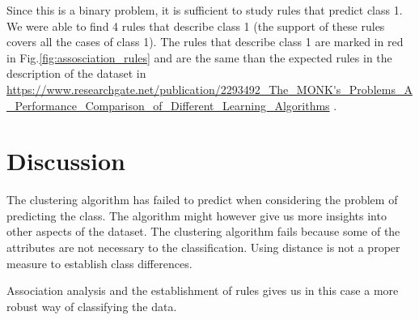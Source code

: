 \documentclass[letterpaper,12pt]{article}
\begin{document}
Since this is a binary problem, it is sufficient to study rules that predict class 1. We were able to find 4 rules that describe class 1 (the support of these rules covers all the cases of class 1). The rules that describe class 1 are marked in red in Fig.\ref{fig:assosciation_rules} and are the same than the expected rules in the description of the dataset in \url{https://www.researchgate.net/publication/2293492_The_MONK's_Problems_A_Performance_Comparison_of_Different_Learning_Algorithms}
.


\section{Discussion}

The clustering algorithm has failed to predict when considering the problem of predicting the class. The algorithm might however give us more insights into other aspects of the dataset. The clustering algorithm fails because some of the attributes are not necessary to the classification. Using distance is not a proper measure to establish class differences.

Association analysis and the establishment of rules gives us in this case a more robust way of classifying the data.
\end{document}
